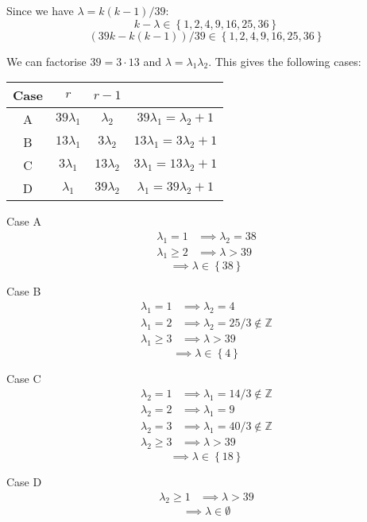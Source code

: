 \documentclass[a4paper, 11pt]{article}
\newcommand{\ZZ}{\mathbb{Z}}
\def\set#1{\left\{ #1 \right\}}
\begin{document}
Since we have $\lambda = k(k-1)/39$:
$$k-\lambda\in\set{1,2,4,9,16,25,36}$$
$$(39k- k(k-1))/39\in\set{1,2,4,9,16,25,36}$$




We can factorise $39=3\cdot 13$ and $\lambda=\lambda_1\lambda_2$. This gives the following cases: 




\begin{tabular}{c|cc|c}
Case& $r$           & $r-1$         &                              \\\midrule
A	& $39\lambda_1$ & $\lambda_2  $ & $39\lambda_1=\lambda_2  +1$  \\
B	& $13\lambda_1$ & $3\lambda_2 $ & $13\lambda_1=3\lambda_2 +1$  \\
C	& $3\lambda_1 $ & $13\lambda_2$ & $3\lambda_1 =13\lambda_2+1$  \\
D	& $\lambda_1  $ & $39\lambda_2$ & $\lambda_1  =39\lambda_2+1$  \\
\end{tabular}

Case A
\begin{align*}
	\lambda_1=1    &\implies \lambda_2=38\\
	\lambda_1\geq 2&\implies \lambda>39
\end{align*}
\[\implies \lambda\in\set{38}\]

Case B
\begin{align*}
	\lambda_1=1    &\implies \lambda_2=4\\
	\lambda_1=2    &\implies \lambda_2=25/3\notin\ZZ\\
	\lambda_1\geq3 &\implies \lambda>39
\end{align*}
\[\implies \lambda\in\set{4}\]

Case C
\begin{align*}
	\lambda_2=1    &\implies \lambda_1=14/3\notin\ZZ\\
	\lambda_2=2    &\implies \lambda_1=9\\
	\lambda_2=3    &\implies \lambda_1=40/3\notin\ZZ\\
	\lambda_2\geq 3&\implies \lambda>39
\end{align*}
\[\implies \lambda\in\set{18}\]

Case D
\begin{align*}
	\lambda_2\geq1 &\implies \lambda>39
\end{align*}
\[\implies \lambda\in\emptyset\]
\end{document}
